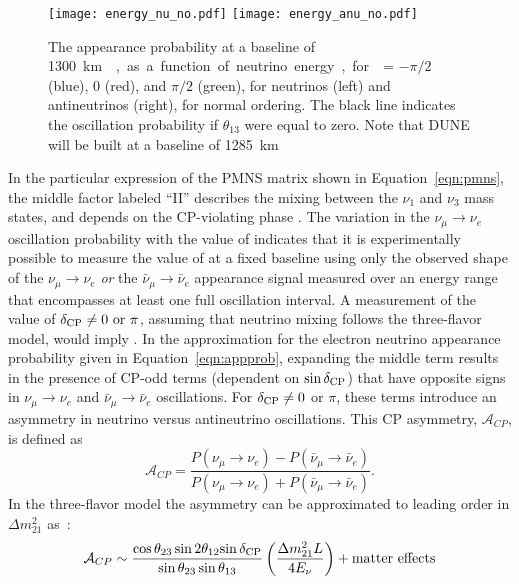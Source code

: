 \begin{figure}
  \centering
\texttt{[image: energy\_nu\_no.pdf]}
\texttt{[image: energy\_anu\_no.pdf]}
  \caption[Appearance probabilities for \nue and \anue at \SI{1300}{\km}]{The appearance probability at a baseline of \SI{1300}\km{},
  as a function of neutrino energy, for \deltacp = $-\pi/2$ (blue), 
  0 (red), and $\pi/2$ (green), for neutrinos (left) and antineutrinos
  (right), for normal ordering. The black line indicates the oscillation
  probability if $\theta_{13}$ were equal to zero. Note that DUNE will be built at a baseline of \SI{1285}\km{}}
  \label{fig:oscprob}
\end{figure}

In the particular expression of the PMNS matrix shown in
Equation~\ref{eqn:pmns}, the middle factor labeled ``II'' describes
the mixing between the $\nu_1$ and $\nu_3$ mass states, and depends on
the CP-violating phase \deltacp. The variation in the $\nu_\mu \rightarrow
\nu_e$ oscillation probability with the value of \deltacp
indicates that it is experimentally possible to measure the value of
\deltacp at a fixed baseline using only the observed shape of the
$\nu_\mu \rightarrow \nu_e$ {\em or} the 
$\bar{\nu}_\mu \rightarrow \bar{\nu}_e$
appearance signal measured over an energy range that encompasses at
least one full oscillation interval. A measurement of the value of
$\delta_{\rm CP} \neq 0 \ {\rm or} \ \pi$, assuming that neutrino mixing follows the three-flavor model, would imply . In the approximation for the electron neutrino appearance
probability given in Equation~\ref{eqn:appprob}, expanding the middle
term results in the presence of CP-odd terms (dependent on $\sin
\delta_{\rm CP}$) that have opposite signs in $\nu_{\mu} \rightarrow \nu_e$
and $\bar{\nu}_{\mu} \rightarrow \bar{\nu}_e$ oscillations.
For $\delta_{\rm CP} \neq 0$ or $\pi$, these terms introduce an asymmetry in
neutrino versus antineutrino oscillations. This CP asymmetry,
$\mathcal{A}_{CP}$, is defined as 
\begin{equation}
\label{eqn:cp-asymm}
 \mathcal{A}_{CP} = \frac{P(\nu_\mu \rightarrow \nu_e) -
  P(\bar{\nu}_\mu \rightarrow \bar{\nu}_e)}{P(\nu_\mu \rightarrow
  \nu_e) + P(\bar{\nu}_\mu \rightarrow \bar{\nu}_e)}.
\end{equation}
In the three-flavor model the asymmetry can be approximated to leading
order in $\Delta m_{21}^2$ as~\cite{Marciano:2006uc}:
\begin{equation}
\mathcal{A}_{CP} \sim \frac{\cos \theta_{23} \sin 2 \theta_{12}
  {\sin \delta_{\rm CP}}}{\sin \theta_{23} \sin \theta_{13}}
\left(\frac{\Delta m^2_{21} L}{ 4 E_{\nu}}\right) + {\rm matter
  \ effects}
\label{eqn:cpasym}
\end{equation}
